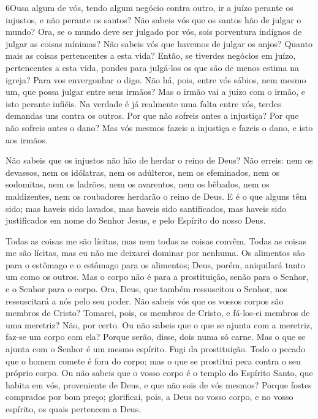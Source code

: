 \medskip

\lettrine{6} Ousa algum de vós, tendo algum negócio contra
outro, ir a juízo perante os injustos, e não perante os santos?
Não sabeis vós que os santos hão de julgar o mundo? Ora, se o
mundo deve ser julgado por vós, sois porventura indignos de julgar
as coisas mínimas? Não sabeis vós que havemos de julgar os
anjos? Quanto mais as coisas pertencentes a esta vida? Então, se
tiverdes negócios em juízo, pertencentes a esta vida, pondes para
julgá-los os que são de menos estima na igreja? Para vos
envergonhar o digo. Não há, pois, entre vós sábios, nem mesmo um,
que possa julgar entre seus irmãos? Mas o irmão vai a juízo com
o irmão, e isto perante infiéis. Na verdade é já realmente uma
falta entre vós, terdes demandas uns contra os outros. Por que não
sofreis antes a injustiça? Por que não sofreis antes o dano? Mas
vós mesmos fazeis a injustiça e fazeis o dano, e isto aos irmãos.

Não sabeis que os injustos não hão de herdar o reino de Deus?
Não erreis: nem os devassos, nem os idólatras, nem os
adúlteros, nem os efeminados, nem os sodomitas, nem os ladrões, nem
os avarentos, nem os bêbados, nem os maldizentes, nem os roubadores
herdarão o reino de Deus. E é o que alguns têm sido; mas
haveis sido lavados, mas haveis sido santificados, mas haveis sido
justificados em nome do Senhor Jesus, e pelo Espírito do nosso Deus.

Todas as coisas me são lícitas, mas nem todas as coisas convêm.
Todas as coisas me são lícitas, mas eu não me deixarei dominar por
nenhuma. Os alimentos são para o estômago e o estômago para
os alimentos; Deus, porém, aniquilará tanto um como os outros. Mas o
corpo não é para a prostituição, senão para o Senhor, e o Senhor
para o corpo. Ora, Deus, que também ressuscitou o Senhor, nos
ressuscitará a nós pelo seu poder. Não sabeis vós que os
vossos corpos são membros de Cristo? Tomarei, pois, os membros de
Cristo, e fá-los-ei membros de uma meretriz? Não, por certo.
Ou não sabeis que o que se ajunta com a meretriz, faz-se um
corpo com ela? Porque serão, disse, dois numa só carne. Mas o
que se ajunta com o Senhor é um mesmo espírito. Fugi da
prostituição. Todo o pecado que o homem comete é fora do corpo; mas
o que se prostitui peca contra o seu próprio corpo. Ou não
sabeis que o vosso corpo é o templo do Espírito Santo, que habita em
vós, proveniente de Deus, e que não sois de vós mesmos?
Porque fostes comprados por bom preço; glorificai, pois, a
Deus no vosso corpo, e no vosso espírito, os quais pertencem a Deus.

